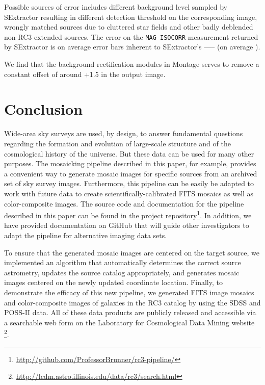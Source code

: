 \documentclass[authoryear, 12pt, 5p, times]{elsarticle}
\begin{document}
Possible sources of error includes different background level sampled by SExtractor resulting in different detection threshold on the corresponding image, wrongly matched sources due to cluttered star fields and other badly deblended non-RC3 extended sources. The error on the \texttt{MAG ISOCORR} measurement returned by SExtractor is on average 
 error bars inherent to SExtractor's ----- (on average ).
 
We find that the background rectification modules in Montage serves to remove a constant offset of around +1.5 in the output image. 




 \section{Conclusion\label{conc-sec}}
 
Wide-area sky surveys are used, by design, to answer fundamental questions regarding the formation and evolution of large-scale structure and of the cosmological history of the universe. But these data can be used for many other purposes. The mosaicking pipeline described in this paper, for example, provides a convenient way to generate mosaic images for specific sources from an archived set of sky survey images.  Furthermore, this pipeline can be easily be adapted to work with future data to create scientifically-calibrated FITS mosaics as well as color-composite images. The source code and documentation for the pipeline described in this paper can be found in the project repository\footnote{\url{http://github.com/ProfessorBrunner/rc3-pipeline/}}. In addition, we have provided documentation on GitHub that will guide other investigators to adapt the pipeline for alternative imaging data sets.

To ensure that the generated mosaic images are centered on the target source, we implemented an algorithm that automatically determines the correct source astrometry, updates the source catalog appropriately, and generates mosaic images centered on the newly updated coordinate location. Finally, to demonstrate the efficacy of this new pipeline, we generated FITS image mosaics and color-composite images of galaxies in the RC3 catalog by using the SDSS and POSS-II data. All of these data products are publicly released and accessible via a searchable web form on the Laboratory for Cosmological Data Mining website \footnote{\url{http://lcdm.astro.illinois.edu/data/rc3/search.html}}.
\end{document}
